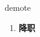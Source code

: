 
\begin{frame}
{\huge demote}
\begin{center}
\begin{enumerate}\Large
  \item \textbf{降职}
\end{enumerate}
\end{center}
\end{frame}

